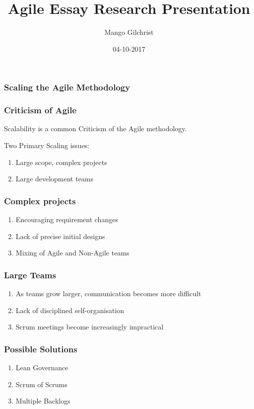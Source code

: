 \documentclass{beamer}
\title{Agile Essay Research Presentation}
\date{04-10-2017}
\author{Mango Gilchrist}
\begin{document}
	
\begin{frame}
	\frametitle{Scaling the Agile Methodology}
	
\end{frame}


\begin{frame}
	\frametitle{Criticism of Agile}
	
	Scalability is a common Criticism of the Agile methodology. 
	
	\vspace{5mm}
	
	Two Primary Scaling issues:	
	\begin{enumerate}
		\item Large scope, complex projects
		\item Large development teams
	\end{enumerate}	
\end{frame}


\begin{frame}
	\frametitle{Complex projects}
	
	\begin{enumerate}
		\item Encouraging requirement changes
		\item Lack of precise initial designs
		\item Mixing of Agile and Non-Agile teams
	\end{enumerate}
\end{frame}
	
	
\begin{frame}
	\frametitle{Large Teams}
	
	\begin{enumerate}
		\item As teams grow larger, communication becomes more difficult
		\item Lack of disciplined self-organisation
		\item Scrum meetings become increasingly impractical
	\end{enumerate}
\end{frame}


\begin{frame}
	\frametitle{Possible Solutions}
	
	\begin{enumerate}
		\item Lean Governance
		\item Scrum of Scrums	
		\item Multiple Backlogs
	\end{enumerate}
\end{frame}
\end{document}

